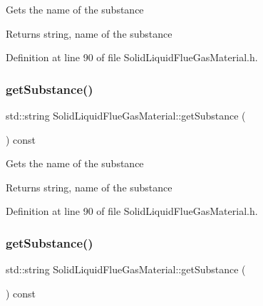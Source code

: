 Gets the name of the substance \begin{DoxyReturn}{Returns}
string, name of the substance 
\end{DoxyReturn}


Definition at line 90 of file Solid\+Liquid\+Flue\+Gas\+Material.\+h.

\mbox{\label{class_solid_liquid_flue_gas_material_a6e07a23fb05c15c7e5dba39334988de8}} 
\subsubsection{\texorpdfstring{get\+Substance()}{getSubstance()}\hspace{0.1cm}{\footnotesize\ttfamily [2/3]}}
{\footnotesize\ttfamily std\+::string Solid\+Liquid\+Flue\+Gas\+Material\+::get\+Substance (\begin{DoxyParamCaption}{ }\end{DoxyParamCaption}) const\hspace{0.3cm}{\ttfamily [inline]}}

Gets the name of the substance \begin{DoxyReturn}{Returns}
string, name of the substance 
\end{DoxyReturn}


Definition at line 90 of file Solid\+Liquid\+Flue\+Gas\+Material.\+h.

\mbox{\label{class_solid_liquid_flue_gas_material_a6e07a23fb05c15c7e5dba39334988de8}} 
\subsubsection{\texorpdfstring{get\+Substance()}{getSubstance()}\hspace{0.1cm}{\footnotesize\ttfamily [3/3]}}
{\footnotesize\ttfamily std\+::string Solid\+Liquid\+Flue\+Gas\+Material\+::get\+Substance (\begin{DoxyParamCaption}{ }\end{DoxyParamCaption}) const\hspace{0.3cm}{\ttfamily [inline]}}

